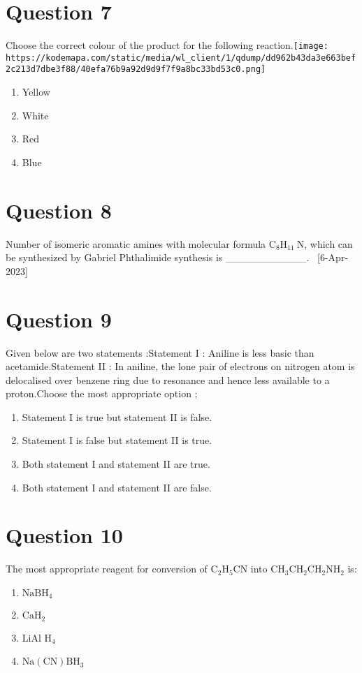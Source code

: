 \documentclass{article}
\begin{document}
\section*{Question 7}
Choose the correct colour of the product for the following reaction.\texttt{[image: https://kodemapa.com/static/media/wl\_client/1/qdump/dd962b43da3e663bef2c213d7dbe3f88/40efa76b9a92d9d9f7f9a8bc33bd53c0.png]}\newline
\begin{enumerate}[label=(\alph*)]
\item Yellow
\item White
\item Red
\item Blue
\end{enumerate}
\newpage
\section*{Question 8}
Number of isomeric aromatic amines with molecular formula \(\mathrm{C}_8 \mathrm{H}_{11} \mathrm{~N}\), which can be synthesized by Gabriel Phthalimide synthesis is ___________.  [6-Apr-2023]
\begin{enumerate}[label=(\alph*)]
\end{enumerate}
\newpage
\section*{Question 9}
Given below are two statements :Statement I : Aniline is less basic than acetamide.Statement II : In aniline, the lone pair of electrons on nitrogen atom is delocalised over benzene ring due to resonance and hence less available to a proton.Choose the most appropriate option ; 
\begin{enumerate}[label=(\alph*)]
\item Statement I is true but statement II is false.
\item Statement I is false but statement II is true.
\item Both statement I and statement II are true.
\item Both statement I and statement II are false.
\end{enumerate}
\newpage
\section*{Question 10}
The most appropriate reagent for conversion of \(\mathrm{C}_2 \mathrm{H}_5 \mathrm{CN}\) into \(\mathrm{CH}_3 \mathrm{CH}_2 \mathrm{CH}_2 \mathrm{NH}_2\) is:
\begin{enumerate}[label=(\alph*)]
\item \(\mathrm{NaBH}_4\)
\item \(\mathrm{CaH}_2\)
\item LiAl H\(_4\)
\item \(\mathrm{Na}(\mathrm{CN}) \mathrm{BH}_3\)
\end{enumerate}
\newpage
\end{document}
